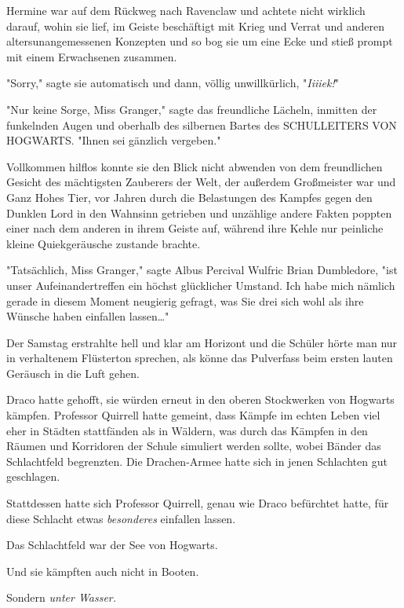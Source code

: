 {\later

Hermine war auf dem Rückweg nach Ravenclaw und achtete nicht wirklich darauf, wohin sie lief, im Geiste beschäftigt mit Krieg und Verrat und anderen altersunangemessenen Konzepten und so bog sie um eine Ecke und stieß prompt mit einem Erwachsenen zusammen.

"Sorry," sagte sie automatisch und dann, völlig unwillkürlich, "\emph{Iiiiek!}"

"Nur keine Sorge, Miss Granger," sagte das freundliche Lächeln, inmitten der funkelnden Augen und oberhalb des silbernen Bartes des SCHULLEITERS VON HOGWARTS. "Ihnen sei gänzlich vergeben."

Vollkommen hilflos konnte sie den Blick nicht abwenden von dem freundlichen Gesicht des mächtigsten Zauberers der Welt, der außerdem Großmeister war und Ganz Hohes Tier, vor Jahren durch die Belastungen des Kampfes gegen den Dunklen Lord in den Wahnsinn getrieben und unzählige andere Fakten poppten einer nach dem anderen in ihrem Geiste auf, während ihre Kehle nur peinliche kleine Quiekgeräusche zustande brachte.

"Tatsächlich, Miss Granger," sagte Albus Percival Wulfric Brian Dumbledore, "ist unser Aufeinandertreffen ein höchst glücklicher Umstand. Ich habe mich nämlich gerade in diesem Moment neugierig gefragt, was Sie drei sich wohl als ihre Wünsche haben einfallen lassen…"

\later

Der Samstag erstrahlte hell und klar am Horizont und die Schüler hörte man nur in verhaltenem Flüsterton sprechen, als könne das Pulverfass beim ersten lauten Geräusch in die Luft gehen.

\later

Draco hatte gehofft, sie würden erneut in den oberen Stockwerken von Hogwarts kämpfen. Professor Quirrell hatte gemeint, dass Kämpfe im echten Leben viel eher in Städten stattfänden als in Wäldern, was durch das Kämpfen in den Räumen und Korridoren der Schule simuliert werden sollte, wobei Bänder das Schlachtfeld begrenzten. Die Drachen-Armee hatte sich in jenen Schlachten gut geschlagen.

Stattdessen hatte sich Professor Quirrell, genau wie Draco befürchtet hatte, für diese Schlacht etwas \emph{besonderes} einfallen lassen.

Das Schlachtfeld war der See von Hogwarts.

Und sie kämpften auch nicht in Booten.

Sondern \emph{unter Wasser.}

}
